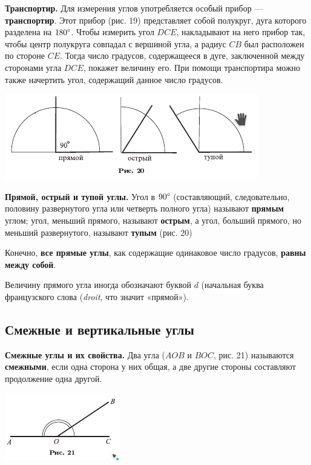 \documentclass[oneside]{book}
\begin{document}
\textbf{Транспортир.}
Для измерения углов употребляется особый прибор — \textbf{транспортир}.
Этот прибор (рис. 19) представляет собой полукруг, дуга которого разделена на $180\degree $.
Чтобы измерить угол $DCE$, накладывают на него прибор так, чтобы центр полукруга совпадал с вершиной угла, а радиус $CB$ был расположен по стороне $CE$.
Тогда число градусов, содержащееся в дуге, заключенной между сторонами угла $DCE$, покажет величину его.
При помощи транспортира можно также начертить угол, содержащий данное число градусов.

\includegraphics{pics/ris-20}

\textbf{Прямой, острый и тупой углы.}
Угол в $90\degree$ (составляющий, следовательно, половину развернутого угла или четверть полного угла) называют \textbf{прямым} углом;
угол, меньший прямого, называют \textbf{острым}, а угол, больший прямого, но меньший развернутого, называют \textbf{тупым} (рис. 20)

Конечно, \textbf{все прямые углы}, как содержащие одинаковое число градусов, \textbf{равны между собой}.

Величину прямого угла иногда обозначают буквой $d$ (начальная буква французского слова (\emph{droit}, что значит «прямой»).

\subsection*{Смежные и вертикальные углы}


\textbf{Смежные углы и их свойства.}
Два угла ($AOB$ и $BOC$, рис. 21) называются \textbf{смежными}, если одна сторона у них общая, а две другие стороны составляют продолжение одна другой.

\includegraphics{pics/ris-21}
\end{document}
